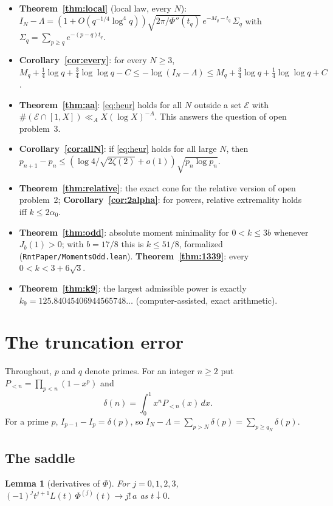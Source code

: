 \documentclass[11pt]{article}
\newtheorem{lemma}[theorem]{Lemma}
\theoremstyle{remark}
\begin{document}
\begin{itemize}
\item \textbf{Theorem~\ref{thm:local}} (local law, every $N$):
$I_N-\Lambda=(1+O(q^{-1/4}\log^4q))\sqrt{2\pi/\Phi''(t_q)}\,e^{-M_q-t_q}\,\Sigma_q$ with
$\Sigma_q=\sum_{p\ge q}e^{-(p-q)t_q}$.
\item \textbf{Corollary~\ref{cor:every}}: for every $N\ge3$,
$M_q+\frac14\log q+\frac34\log\log q-C\le-\log(I_N-\Lambda)\le M_q+\frac34\log q+\frac14\log\log q+C$.
\item \textbf{Theorem~\ref{thm:aa}}: \eqref{eq:heur} holds for all $N$ outside a set
$\mathcal E$ with $\#(\mathcal E\cap[1,X])\ll_AX(\log X)^{-A}$. This answers the question
of open problem~3.
\item \textbf{Corollary~\ref{cor:allN}}: if \eqref{eq:heur} holds for all large $N$, then
$p_{n+1}-p_n\le(\log4/\sqrt{2\zeta(2)}+o(1))\sqrt{p_n\log p_n}$.
\item \textbf{Theorem~\ref{thm:relative}}: the exact cone for the relative version of open
problem~2; \textbf{Corollary~\ref{cor:2alpha}}: for powers, relative extremality holds iff
$k\le2\alpha_0$.
\item \textbf{Theorem~\ref{thm:odd}}: absolute moment minimality for $0<k\le3b$ whenever
$J_b(1)>0$; with $b=17/8$ this is $k\le51/8$, formalized (\texttt{RntPaper/MomentsOdd.lean}).
\textbf{Theorem~\ref{thm:1339}}: every $0<k<3+6\sqrt3$.
\item \textbf{Theorem~\ref{thm:k9}}: the largest admissible power is exactly
$k_9=125.84045406944565748\ldots$ (computer-assisted, exact arithmetic).
\end{itemize}

\section{The truncation error}\label{sec:op3}

Throughout, $p$ and $q$ denote primes. For an integer $n\ge2$ put
$P_{<n}=\prod_{p<n}(1-x^p)$ and
\[
\delta(n)=\int_0^1x^nP_{<n}(x)\,dx .
\]
For a prime $p$, $I_{p-1}-I_p=\delta(p)$, so $I_N-\Lambda=\sum_{p>N}\delta(p)=\sum_{p\ge q_N}\delta(p)$.

\subsection{The saddle}

\begin{lemma}[derivatives of $\Phi$]\label{lem:deriv}
For $j=0,1,2,3$, $(-1)^jt^{j+1}L(t)\,\Phi^{(j)}(t)\to j!\,a$ as $t\downarrow0$.
\end{lemma}
\end{document}
